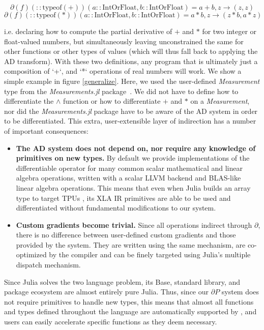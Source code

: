 \documentclass{juliacon}
\newcommand{\Zygote}{\iftoggle{anonymous}{$\partial$P.jl}{Zygote}}
\begin{document}
\[
\partial(f)(::\text{typeof}(+))(a::\text{IntOrFloat}, b::\text{IntOrFloat}) = a + b, z \to (z, z) \]\[
\partial(f)(::\text{typeof}(*))(a::\text{IntOrFloat}, b::\text{IntOrFloat}) = a * b, z \to (z * b, a * z)
\]

    i.e. declaring how to compute the partial derivative of $+$ and $*$ for two integer or float-valued numbers, but simultaneously leaving unconstrained the same for other functions or other types of  values (which will thus fall back to applying the AD transform). With these two definitions, any program that is ultimately just a composition of `+`, and `*` operations of real numbers will work. We show a simple example in figure \ref{generalize}. Here, we used the user-defined \textit{Measurement} type from the \textit{Measurements.jl} package~\cite{Measurements.jl-2016}. We did not have to define how to differentiate the $\wedge$ function or how to differentiate $+$ and $*$ on a \textit{Measurement}, nor did the \textit{Measurements.jl} package have to be aware of the AD system in order to be differentiated. This extra, user-extensible layer of indirection has a number of important consequences:

    \begin{itemize}
        \item \textbf{The AD system does not depend on, nor require any knowledge of primitives on new types.} By default we provide implementations of the differentiable operator for many common scalar mathematical and linear algebra operations, written with a scalar LLVM backend and BLAS-like linear algebra operations. This means that even when Julia builds an array type to target TPUs \cite{XLA.jl-2018}, its XLA IR primitives are able to be used and differentiated without fundamental modifications to our system.
    \item \textbf{Custom gradients become trivial.} Since all operations indirect through $\partial$, there is no difference between user-defined custom gradients and those provided by the system. They are written using the same mechanism, are co-optimized by the compiler and can be finely targeted using Julia's multiple dispatch mechanism.
\end{itemize}

Since Julia solves the two language problem, its Base, standard library, and package ecosystem are almost entirely pure Julia. Thus, since our $\partial P$ system does not require primitives to handle new types, this means that almost all functions and types defined throughout the language are automatically supported by \Zygote, and users can easily accelerate specific functions as they deem necessary.
\end{document}
